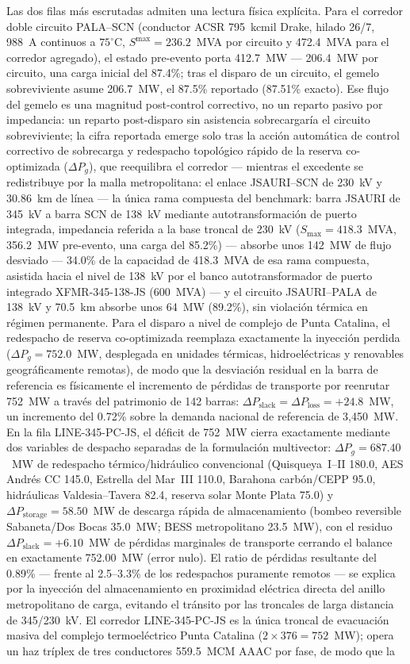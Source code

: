 Las dos filas más escrutadas admiten una lectura física explícita. Para el corredor doble circuito PALA--SCN (conductor ACSR 795~kcmil Drake, hilado 26/7, 988~A continuos a $75^{\circ}$C, $S^{\max} = 236.2$~MVA por circuito y 472.4~MVA para el corredor agregado), el estado pre-evento porta 412.7~MW --- 206.4~MW por circuito, una carga inicial del 87.4\%; tras el disparo de un circuito, el gemelo sobreviviente asume 206.7~MW, el 87.5\% reportado (87.51\% exacto). Ese flujo del gemelo es una magnitud post-control correctivo, no un reparto pasivo por impedancia: un reparto post-disparo sin asistencia sobrecargaría el circuito sobreviviente; la cifra reportada emerge solo tras la acción automática de control correctivo de sobrecarga y redespacho topológico rápido de la reserva co-optimizada ($\Delta P_g$), que reequilibra el corredor --- mientras el excedente se redistribuye por la malla metropolitana: el enlace JSAURI--SCN de 230~kV y 30.86~km de línea --- la única rama compuesta del benchmark: barra JSAURI de 345~kV a barra SCN de 138~kV mediante autotransformación de puerto integrada, impedancia referida a la base troncal de 230~kV ($S_{\max} = 418.3$~MVA, 356.2~MW pre-evento, una carga del 85.2\%) --- absorbe unos 142~MW de flujo desviado --- 34.0\% de la capacidad de 418.3~MVA de esa rama compuesta, asistida hacia el nivel de 138~kV por el banco autotransformador de puerto integrado XFMR-345-138-JS (600~MVA) --- y el circuito JSAURI--PALA de 138~kV y 70.5~km absorbe unos 64~MW (89.2\%), sin violación térmica en régimen permanente. Para el disparo a nivel de complejo de Punta Catalina, el redespacho de reserva co-optimizada reemplaza exactamente la inyección perdida ($\Delta P_g = 752.0$~MW, desplegada en unidades térmicas, hidroeléctricas y renovables geográficamente remotas), de modo que la desviación residual en la barra de referencia es físicamente el incremento de pérdidas de transporte por reenrutar 752~MW a través del patrimonio de 142 barras: $\Delta P_{\mathrm{slack}} = \Delta P_{\mathrm{loss}} = +24.8$~MW, un incremento del 0.72\% sobre la demanda nacional de referencia de 3,450~MW. En la fila LINE-345-PC-JS, el déficit de 752~MW cierra exactamente mediante dos variables de despacho separadas de la formulación multivector: $\Delta P_g = 687.40$~MW de redespacho térmico/hidráulico convencional (Quisqueya~I--II 180.0, AES Andr\'es CC 145.0, Estrella del Mar~III 110.0, Barahona carbón/CEPP 95.0, hidráulicas Valdesia--Tavera 82.4, reserva solar Monte Plata 75.0) y $\Delta P_{\mathrm{storage}} = 58.50$~MW de descarga rápida de almacenamiento (bombeo reversible Sabaneta/Dos Bocas 35.0~MW; BESS metropolitano 23.5~MW), con el residuo $\Delta P_{\mathrm{slack}} = +6.10$~MW de pérdidas marginales de transporte cerrando el balance en exactamente 752.00~MW (error nulo). El ratio de pérdidas resultante del 0.89\% --- frente al 2.5--3.3\% de los redespachos puramente remotos --- se explica por la inyección del almacenamiento en proximidad eléctrica directa del anillo metropolitano de carga, evitando el tránsito por las troncales de larga distancia de 345/230~kV. El corredor LINE-345-PC-JS es la única troncal de evacuación masiva del complejo termoeléctrico Punta Catalina ($2 \times 376 = 752$~MW); opera un haz tríplex de tres conductores 559.5~MCM AAAC por fase, de modo que la 